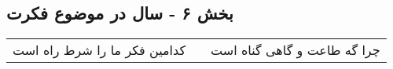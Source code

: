 \begin{center}
\section*{بخش ۶ - سال در موضوع فکرت}
\label{sec:sh006}
\begin{longtable}{l p{0.5cm} r}
کدامین فکر ما را شرط راه است
&&
چرا گه طاعت و گاهی گناه است
\\
\end{longtable}
\end{center}
